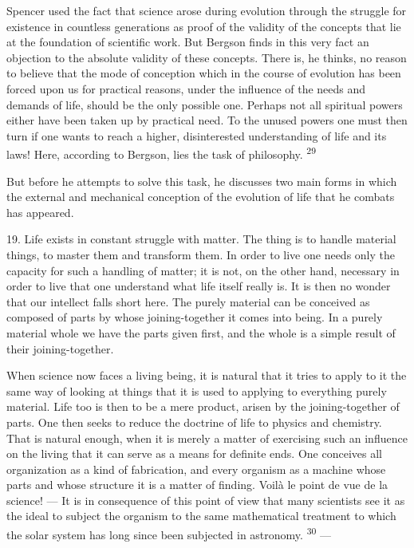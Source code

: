 \documentclass[12pt,a4paper,openany]{book}
\newcommand{\opage}[1]{\marginnote{\footnotesize\textit{[#1]}}}
\newcommand{\nm}[1]{\unskip\textsuperscript{#1}}
\begin{document}
Spencer used the fact that science arose during evolution through the struggle for existence in countless generations as proof of the validity of the concepts that lie at the foundation of scientific work. But Bergson finds in this very fact an objection to the absolute validity of these concepts. There is, he thinks, no reason to believe that the mode of conception which in the course of evolution has been forced upon us for practical reasons, under the influence of the needs and demands of life, should be the only possible one. Perhaps not all spiritual powers either have been taken up by practical need. To the unused powers one must then turn if one wants to reach a higher, disinterested understanding of life and its laws! Here, according to Bergson, lies the task of philosophy. \nm{29}

But before he attempts to solve this task, he discusses two main forms in which the external and mechanical conception of the evolution of life that he combats has appeared.

19. Life exists in constant struggle with matter. The thing is to handle material things, to master them and transform them. In order to live one needs only the capacity for such a handling of matter; it is not, on the other hand, necessary in order to live that one understand what life itself really is. It is then no wonder that our intellect falls short here. The purely material can be conceived as composed of parts by whose joining-together it comes into being. In a purely material whole we have
\opage{37}the parts given first, and the whole is a simple result of their joining-together.

When science now faces a living being, it is natural that it tries to apply to it the same way of looking at things that it is used to applying to everything purely material. Life too is then to be a mere product, arisen by the joining-together of parts. One then seeks to reduce the doctrine of life to physics and chemistry. That is natural enough, when it is merely a matter of exercising such an influence on the living that it can serve as a means for definite ends. One conceives all organization as a kind of fabrication, and every organism as a machine whose parts and whose structure it is a matter of finding. Voilà le point de vue de la science! --- It is in consequence of this point of view that many scientists see it as the ideal to subject the organism to the same mathematical treatment to which the solar system has long since been subjected in astronomy. \nm{30} ---
\end{document}
